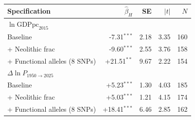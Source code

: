 \begin{tabular}{lrrrr}
\toprule
Specification & $\hat\beta_{H}$ & SE & $|t|$ & $N$ \\
\midrule
\multicolumn{5}{l}{\textit{$\ln\text{GDPpc}_{2015}$}} \\
\quad Baseline & -7.31$^{***}$ & 2.18 & 3.35 & 160 \\
\quad + Neolithic frac & -9.60$^{***}$ & 2.55 & 3.76 & 158 \\
\quad + Functional alleles (8 SNPs) & +21.51$^{**}$ & 9.67 & 2.22 & 154 \\
\midrule
\multicolumn{5}{l}{\textit{$\Delta\ln\!P_{1950\to2025}$}} \\
\quad Baseline & +5.23$^{***}$ & 1.30 & 4.03 & 185 \\
\quad + Neolithic frac & +5.03$^{***}$ & 1.21 & 4.15 & 174 \\
\quad + Functional alleles (8 SNPs) & +18.41$^{***}$ & 6.46 & 2.85 & 162 \\
\bottomrule
\end{tabular}
